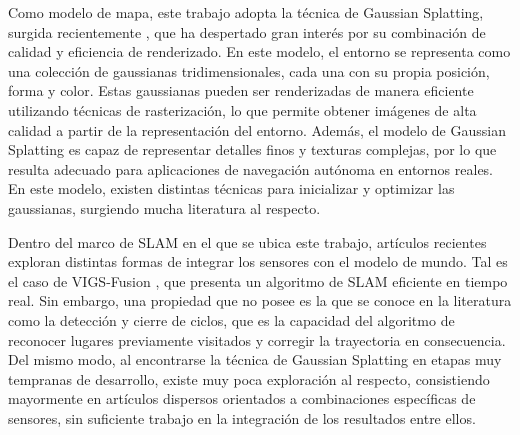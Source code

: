 Como modelo de mapa, este trabajo adopta la técnica de Gaussian Splatting, surgida recientemente \cite{kerbl2023gaussian}, que ha despertado gran interés por su combinación de calidad y eficiencia de renderizado. En este modelo, el entorno se representa como una colección de gaussianas tridimensionales, cada una con su propia posición, forma y color. Estas gaussianas pueden ser renderizadas de manera eficiente utilizando técnicas de rasterización, lo que permite obtener imágenes de alta calidad a partir de la representación del entorno. Además, el modelo de Gaussian Splatting es capaz de representar detalles finos y texturas complejas, por lo que resulta adecuado para aplicaciones de navegación autónoma en entornos reales. En este modelo, existen distintas técnicas para inicializar y optimizar las gaussianas, surgiendo mucha literatura al respecto.

Dentro del marco de SLAM en el que se ubica este trabajo, artículos recientes exploran distintas formas de integrar los sensores con el modelo de mundo. Tal es el caso de VIGS-Fusion \cite{ndoye2025vigs}, que presenta un algoritmo de SLAM eficiente en tiempo real. Sin embargo, una propiedad que no posee es la que se conoce en la literatura como la detección y cierre de ciclos, que es la capacidad del algoritmo de reconocer lugares previamente visitados y corregir la trayectoria en consecuencia. Del mismo modo, al encontrarse la técnica de Gaussian Splatting en etapas muy tempranas de desarrollo, existe muy poca exploración al respecto, consistiendo mayormente en artículos dispersos orientados a combinaciones específicas de sensores, sin suficiente trabajo en la integración de los resultados entre ellos.
